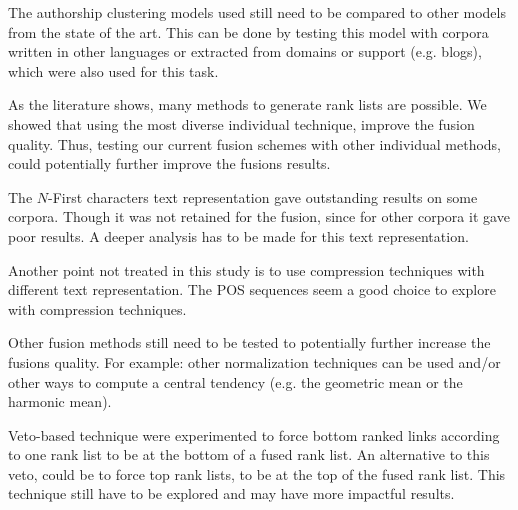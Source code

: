 The authorship clustering models used still need to be compared to other models from the state of the art.
This can be done by testing this model with corpora written in other languages or extracted from domains or support (e.g. blogs), which were also used for this task.

As the literature shows, many methods to generate rank lists are possible.
We showed that using the most diverse individual technique, improve the fusion quality.
Thus, testing our current fusion schemes with other individual methods, could potentially further improve the fusions results.

The $N$-First characters text representation gave outstanding results on some corpora.
Though it was not retained for the fusion, since for other corpora it gave poor results.
A deeper analysis has to be made for this text representation.

Another point not treated in this study is to use compression techniques with different text representation.
The POS sequences seem a good choice to explore with compression techniques.

Other fusion methods still need to be tested to potentially further increase the fusions quality.
For example: other normalization techniques can be used and/or other ways to compute a central tendency (e.g. the geometric mean or the harmonic mean).

Veto-based technique were experimented to force bottom ranked links according to one rank list to be at the bottom of a fused rank list.
An alternative to this veto, could be to force top rank lists, to be at the top of the fused rank list.
This technique still have to be explored and may have more impactful results.
